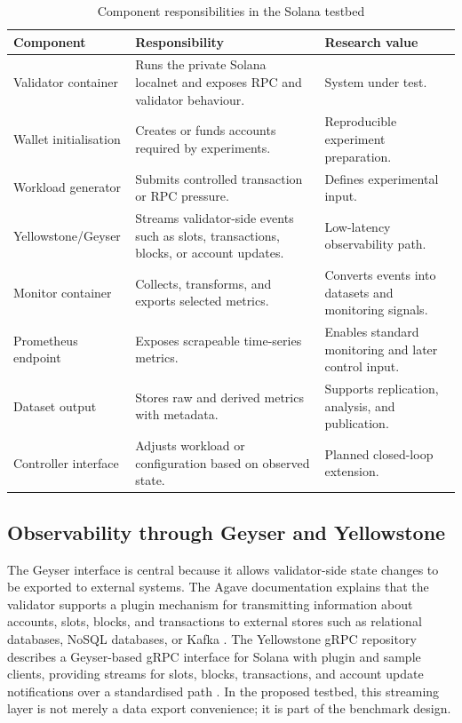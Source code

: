 \documentclass[11pt,a4paper]{article}
\begin{document}
\begin{table}[H]
\centering
\caption{Component responsibilities in the Solana testbed}
\label{tab:components}
\begin{tabularx}{\textwidth}{L{3.3cm}Y Y}
\toprule
\textbf{Component} & \textbf{Responsibility} & \textbf{Research value} \\
\midrule
Validator container & Runs the private Solana localnet and exposes RPC and validator behaviour. & System under test. \\
Wallet initialisation & Creates or funds accounts required by experiments. & Reproducible experiment preparation. \\
Workload generator & Submits controlled transaction or RPC pressure. & Defines experimental input. \\
Yellowstone/Geyser & Streams validator-side events such as slots, transactions, blocks, or account updates. & Low-latency observability path. \\
Monitor container & Collects, transforms, and exports selected metrics. & Converts events into datasets and monitoring signals. \\
Prometheus endpoint & Exposes scrapeable time-series metrics. & Enables standard monitoring and later control input. \\
Dataset output & Stores raw and derived metrics with metadata. & Supports replication, analysis, and publication. \\
Controller interface & Adjusts workload or configuration based on observed state. & Planned closed-loop extension. \\
\bottomrule
\end{tabularx}
\end{table}

\subsection{Observability through Geyser and Yellowstone}
\label{subsec:geyser}

The Geyser interface is central because it allows validator-side state changes to be exported to external systems. The Agave documentation explains that the validator supports a plugin mechanism for transmitting information about accounts, slots, blocks, and transactions to external stores such as relational databases, NoSQL databases, or Kafka \cite{anza2026geyser}. The Yellowstone gRPC repository describes a Geyser-based gRPC interface for Solana with plugin and sample clients, providing streams for slots, blocks, transactions, and account update notifications over a standardised path \cite{rpcpool2026yellowstone}. In the proposed testbed, this streaming layer is not merely a data export convenience; it is part of the benchmark design.
\end{document}
